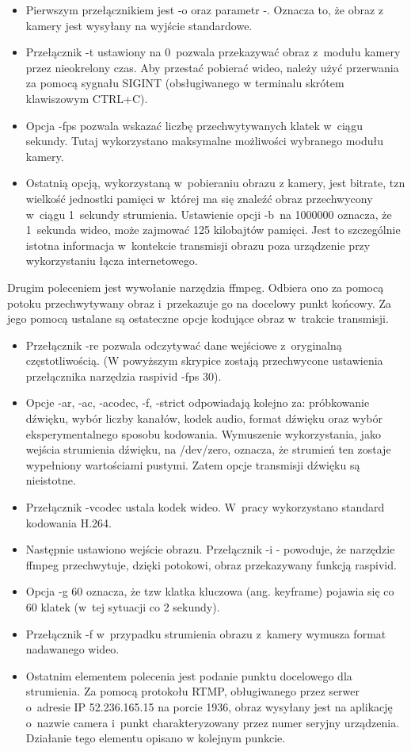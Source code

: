 \begin{itemize}
\item Pierwszym przełącznikiem jest -o oraz parametr -. Oznacza to, że obraz z kamery jest wysyłany na wyjście standardowe.
\item Przełącznik -t ustawiony na 0~pozwala przekazywać obraz z~modułu kamery przez nieokrelony czas. Aby przestać pobierać wideo, należy użyć przerwania za pomocą sygnału SIGINT (obsługiwanego w terminalu skrótem klawiszowym CTRL+C).
\item Opcja -fps pozwala wskazać liczbę przechwytywanych klatek w~ciągu sekundy. Tutaj wykorzystano maksymalne możliwości wybranego modułu kamery.
\item Ostatnią opcją, wykorzystaną w~pobieraniu obrazu z kamery, jest bitrate, tzn wielkość jednostki pamięci w~której ma się znaleźć obraz przechwycony w~ciągu 1~sekundy strumienia. Ustawienie opcji -b~na 1000000 oznacza, że 1~sekunda wideo, może zajmować 125 kilobajtów pamięci. Jest to szczególnie istotna informacja w~kontekcie transmisji obrazu poza urządzenie przy wykorzystaniu łącza internetowego.
\end{itemize}

Drugim poleceniem jest wywołanie narzędzia ffmpeg. Odbiera ono za pomocą potoku przechwytywany obraz i~przekazuje go na docelowy punkt końcowy. Za jego pomocą ustalane są ostateczne opcje kodujące obraz w~trakcie transmisji.
\begin{itemize}
	\item Przełącznik -re pozwala odczytywać dane wejściowe z~oryginalną częstotliwością. (W powyższym skrypice zostają przechwycone ustawienia przełącznika narzędzia raspivid -fps 30).
\item Opcje  -ar, -ac, -acodec, -f, -strict odpowiadają kolejno za: próbkowanie dźwięku, wybór liczby kanałów, kodek audio, format dźwięku oraz wybór eksperymentalnego sposobu kodowania. Wymuszenie wykorzystania, jako wejścia strumienia dźwięku, na /dev/zero, oznacza, że strumień ten zostaje wypełniony wartościami pustymi. Zatem opcje transmisji dźwięku są nieistotne.
\item Przełącznik -vcodec ustala kodek wideo. W~pracy wykorzystano standard kodowania H.264.
\item Następnie ustawiono wejście obrazu. Przełącznik -i - powoduje, że narzędzie ffmpeg przechwytuje, dzięki potokowi, obraz przekazywany funkcją raspivid.
\item Opcja -g 60 oznacza, że tzw klatka kluczowa (ang. keyframe) pojawia się co 60 klatek (w~tej sytuacji co 2 sekundy). 
\item Przełącznik -f w~przypadku strumienia obrazu z~kamery wymusza format nadawanego wideo.  
\item Ostatnim elementem polecenia jest podanie punktu docelowego dla strumienia. Za pomocą protokołu RTMP, obługiwanego przez serwer o~adresie IP 52.236.165.15 na porcie 1936, obraz wysyłany jest na aplikację o~nazwie camera i~punkt charakteryzowany przez numer seryjny urządzenia. Działanie tego elementu opisano w kolejnym punkcie. 
\end{itemize}

